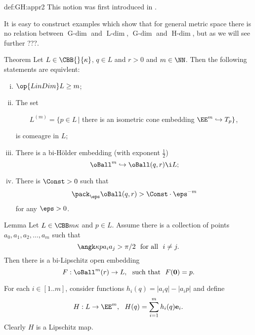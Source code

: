 {\begin{subthm}{def:GH:appr2}
This notion was first introduced in \cite{kleiner}.

It is easy to construct examples which show that for general metric space there is no relation between $\text{G-}\!\dim$ and $\text{L-}\!\dim$, $\text{G-}\!\dim$ and $\text{H-}\!\dim$,
but as we will see further ???.




















\begin{thm}{Theorem}\label{thm:dim-infty}
Let $L\in\CBB{}{\kappa}$, $q\in L$ and $r>0$ and $m\in \NN$.
Then the following statements are equivlent:
\begin{enumerate}[(i)]
\item\label{LinDim}  $\op{LinDim}L\ge m$;
\item\label{LinDim+} The set 

\ \ \ \ $L^{(m)}=\{p\in L\,|$ there is an isometric cone embedding $\EE^m\hookrightarrow T_p\}$, 

\noi is comeagre in $L$;
\item\label{TopDim} There is a bi-H\"older embedding (with exponent $\tfrac12$) 
$$\oBall^m\hookrightarrow \oBall(q,r)\i L;$$
\item\label{pack} There is $\Const>0$ such that 
$$\pack_\eps \oBall(q,r)>\Const\cdot\eps^{-m}$$
for any $\eps>0$.
\end{enumerate}
\end{thm}













\begin{thm}{Lemma}\label{lem:Lip-homeo}
Let $L\in\CBB m\kappa$ and $p\in L$.
Assume there is a collection of points $a_0,a_1,a_2,\dots,a_m$ such that 
$$\angk\kappa p{a_i}{a_j}>\pi/2\ \ \text{for all}\ \  i\not=j.$$ 
Then there is a bi-Lipschitz open embedding 
$$F:\oBall^m(r)\to L,\ \  \text{such that}\ \  F(\mathbf 0)=p.$$
\end{thm}

For each $i\in[1..m]$, consider functions $h_i(q)=|a_iq|-|a_ip|$ and define 
$$H:L\to\EE^m,\ \ H(q)=\sum_{i=1}^mh_i(q)\mathbf e_i.$$
Clearly $H$ is a Lipschitz map.


\end{subthm}}
